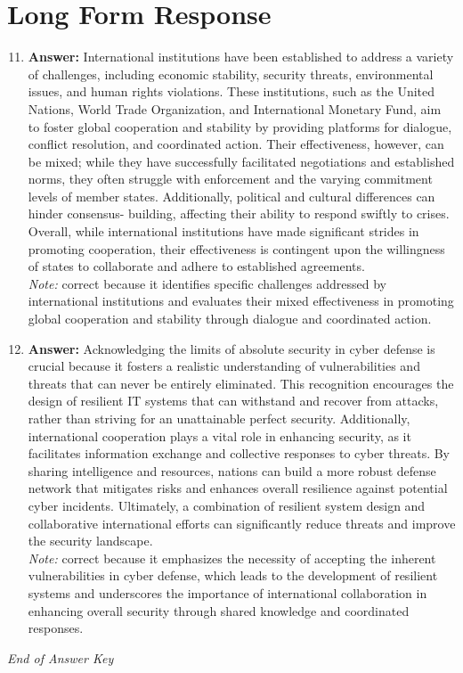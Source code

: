 \documentclass[12pt]{article}
\begin{document}
\section*{Long Form Response}
\begin{enumerate}[label=\arabic*.]
\setcounter{enumi}{10}
\item \textbf{Answer:} International institutions have been established to address a variety of challenges, including economic stability, security threats, environmental issues, and human rights violations. These institutions, such as the United Nations, World Trade Organization, and International Monetary Fund, aim to foster global cooperation and stability by providing platforms for dialogue, conflict resolution, and coordinated action. Their effectiveness, however, can be mixed; while they have successfully facilitated negotiations and established norms, they often struggle with enforcement and the varying commitment levels of member states. Additionally, political and cultural differences can hinder consensus- building, affecting their ability to respond swiftly to crises. Overall, while international institutions have made significant strides in promoting cooperation, their effectiveness is contingent upon the willingness of states to collaborate and adhere to established agreements.
\\ \textit{Note:} correct because it identifies specific challenges addressed by international institutions and evaluates their mixed effectiveness in promoting global cooperation and stability through dialogue and coordinated action.
\item \textbf{Answer:} Acknowledging the limits of absolute security in cyber defense is crucial because it fosters a realistic understanding of vulnerabilities and threats that can never be entirely eliminated. This recognition encourages the design of resilient IT systems that can withstand and recover from attacks, rather than striving for an unattainable perfect security. Additionally, international cooperation plays a vital role in enhancing security, as it facilitates information exchange and collective responses to cyber threats. By sharing intelligence and resources, nations can build a more robust defense network that mitigates risks and enhances overall resilience against potential cyber incidents. Ultimately, a combination of resilient system design and collaborative international efforts can significantly reduce threats and improve the security landscape.
\\ \textit{Note:} correct because it emphasizes the necessity of accepting the inherent vulnerabilities in cyber defense, which leads to the development of resilient systems and underscores the importance of international collaboration in enhancing overall security through shared knowledge and coordinated responses.
\end{enumerate}

\vfill
\noindent\textit{End of Answer Key}
\end{document}

